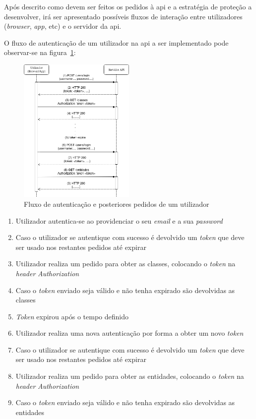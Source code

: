 Após descrito como devem ser feitos os pedidos à \acrshort{api} e a estratégia de proteção a desenvolver, irá ser apresentado possíveis fluxos de interação entre utilizadores (\textit{browser}, \textit{app}, etc) e o servidor da \acrshort{api}.

O fluxo de autenticação de um utilizador na \acrshort{api} a ser implementado pode observar-se na figura~\ref{fig:userAuth}:
\begin{figure}[H]
    \centering
    \includegraphics[width=0.5\textwidth]{img/userAuth.png}
    \caption{Fluxo de autenticação e posteriores pedidos de um utilizador}\label{fig:userAuth}
\end{figure}

\begin{enumerate}
    \item Utilizador autentica-se ao providenciar o seu \textit{email} e a sua \textit{password}
    \item Caso o utilizador se autentique com sucesso é devolvido um \textit{token} que deve ser usado nos restantes pedidos até expirar
    \item Utilizador realiza um pedido para obter as classes, colocando o \textit{token} na \textit{header} \textit{Authorization}
    \item Caso o \textit{token} enviado seja válido e não tenha expirado são devolvidas as classes
    \item \textit{Token} expirou após o tempo definido
    \item Utilizador realiza uma nova autenticação por forma a obter um novo \textit{token}
    \item Caso o utilizador se autentique com sucesso é devolvido um \textit{token} que deve ser usado nos restantes pedidos até expirar
    \item Utilizador realiza um pedido para obter as entidades, colocando o \textit{token} na \textit{header} \textit{Authorization}
    \item Caso o \textit{token} enviado seja válido e não tenha expirado são devolvidas as entidades
\end{enumerate}

